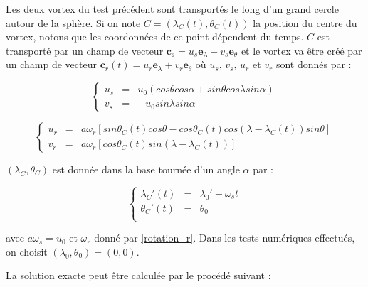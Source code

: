 Les deux vortex du test précédent sont transportés le long d'un grand cercle autour de la sphère. Si on note $C=(\lambda_C(t), \theta_C(t))$ la position du centre du vortex, notons que les coordonnées de ce point dépendent du temps. $C$ est transporté par un champ de vecteur $\mathbf{c_s} = u_s \mathbf{e}_{\lambda} + v_s \mathbf{e}_{\theta}$ et le vortex va être créé par un champ de vecteur $\mathbf{c}_r(t)=u_r \mathbf{e}_{\lambda} + v_r \mathbf{e}_{\theta}$ où $u_s$, $v_s$, $u_r$ et $v_r$ sont donnés par :

\begin{equation}
\left\lbrace
\begin{array}{rcl}
u_s & = & u_0 ( cos \theta cos \alpha + sin \theta cos \lambda sin \alpha ) \\
v_s & = & - u_0 sin \lambda sin \alpha 
\end{array}
\right.
\end{equation}

\begin{equation}
\left\lbrace
\begin{array}{rcl}
u_r & = & a \omega_r  \left[ sin \theta_C(t) cos \theta - cos \theta_C(t) cos( \lambda - \lambda_C(t) ) sin \theta \right] \\
v_r & = & a \omega_r  \left[ cos \theta_C(t) sin ( \lambda - \lambda_C(t)) \right]
\end{array}
\right.
\end{equation}

$(\lambda_C, \theta_C)$ est donnée dans la base tournée d'un angle $\alpha$ par :

\begin{equation}
\label{centre vortex}
\left\lbrace
\begin{array}{rcl}
\lambda_C'(t) & = & \lambda_0' + \omega_s t\\
\theta_C'(t) & = & \theta_0 \\
\end{array}
\right.
\end{equation}

avec $a \omega_s = u_0$ et $\omega_r$ donné par \eqref{rotation_r}. Dans les tests numériques effectués, on choisit $(\lambda_0, \theta_0) = (0,0)$.

La solution exacte peut être calculée par le procédé suivant :

